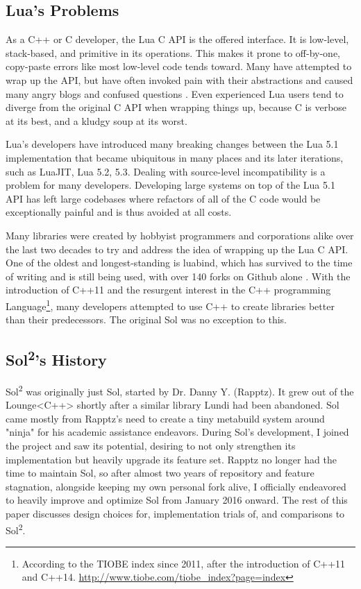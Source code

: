 \documentclass[conference,compsoc]{IEEEtran}
\newcommand{\loungecxx}{Lounge\textless{}C++\textgreater{}}
\newcommand{\soltwo}{Sol\textsuperscript{2}}
\begin{document}
\subsection{Lua's Problems}

As a C++ or C developer, the Lua C API is the offered interface. It is low-level, stack-based, and primitive in its operations. This makes it prone to off-by-one, copy-paste errors like most low-level code tends toward\cite{copy-paste-errors}\cite{gcc-in-cxx-slides}\cite{gcc-in-cxx}. Many have attempted to wrap up the API, but have often invoked pain with their abstractions and caused many angry blogs and confused questions \cite{glue-rant}\cite{fun-lua-bindings}. Even experienced Lua users tend to diverge from the original C API when wrapping things up, because C is verbose at its best, and a kludgy soup at its worst\cite{conman-binding}.

Lua's developers have introduced many breaking changes between the Lua 5.1 implementation that became ubiquitous in many places and its later iterations, such as LuaJIT, Lua 5.2, 5.3. Dealing with source-level incompatibility is a problem for many developers\cite{api-evolution}. Developing large systems on top of the Lua 5.1 API has left large codebases where refactors of all of the C code would be exceptionally painful and is thus avoided at all costs.

Many libraries were created by hobbyist programmers and corporations alike over the last two decades to try and address the idea of wrapping up the Lua C API. One of the oldest and longest-standing is luabind, which has survived to the time of writing and is still being used, with over 140 forks on Github alone \cite{luabind}. With the introduction of C++11 and the resurgent interest in the C++ programming Language\footnote{According to the TIOBE index since 2011, after the introduction of C++11 and C++14. \url{http://www.tiobe.com/tiobe_index?page=index}}, many developers attempted to use C++ to create libraries better than their predecessors. The original Sol was no exception to this.

\subsection{\soltwo{}'s History}

\soltwo{} was originally just Sol, started by Dr. Danny Y. (Rapptz)\cite{sol}. It grew out of the \loungecxx{} shortly after a similar library Lundi\cite{lundi} had been abandoned. Sol came mostly from Rapptz's need to create a tiny metabuild system around "ninja"\cite{ninja} for his academic assistance endeavors. During Sol's development, I joined the project and saw its potential, desiring to not only strengthen its implementation but heavily upgrade its feature set. Rapptz no longer had the time to maintain Sol, so after almost two years of repository and feature stagnation, alongside keeping my own personal fork alive, I officially endeavored to heavily improve and optimize Sol from January 2016 onward. The rest of this paper discusses design choices for, implementation trials of, and comparisons to \soltwo{}.
\end{document}
